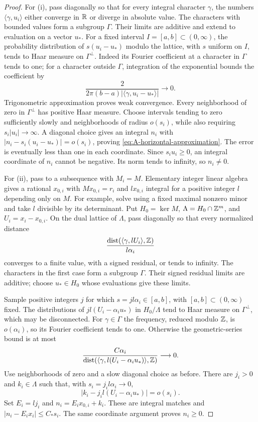 \begin{proof}
For \textup{(i)}, pass diagonally so that for every integral character
\(\gamma\), the numbers \(\langle\gamma,u_i\rangle\) either converge
in \(\mathbb R\) or diverge in absolute value.  The characters with bounded
values form a subgroup \(\Gamma\).  Their limits are additive and
extend to evaluation on a vector \(u_*\).
For a fixed interval \(I=[a,b]\subset(0,\infty)\), the probability
distribution of \(s(u_i-u_*)\) modulo the lattice, with \(s\) uniform
on \(I\), tends to Haar measure on \(\Gamma^\perp\).
Indeed its Fourier coefficient at a character in \(\Gamma\) tends to
one; for a character outside \(\Gamma\), integration of the
exponential bounds the coefficient by
\[
 \frac{2}{2\pi(b-a)
       \lvert\langle\gamma,u_i-u_*\rangle\rvert}\longrightarrow0.
\]
Trigonometric approximation proves weak convergence.
Every neighborhood of zero in \(\Gamma^\perp\) has positive Haar
measure.  Choose intervals tending to zero sufficiently slowly and
neighborhoods of radius \(o(s_i)\), while also requiring
\(s_i\lvert u_i\rvert\to\infty\).
A diagonal choice gives an integral \(n_i\) with
\(\lvert n_i-s_i(u_i-u_*)\rvert=o(s_i)\), proving
\eqref{eq:A-horizontal-approximation}.
The error is eventually less than one in each coordinate.
Since \(s_i u_i\ge0\), an integral coordinate of \(n_i\) cannot be
negative.  Its norm tends to infinity, so \(n_i\ne0\).

For \textup{(ii)}, pass to a subsequence with \(M_i=M\).
Elementary integer linear algebra gives a rational \(x_{0,i}\) with
\(Mx_{0,i}=r_i\) and \(l x_{0,i}\) integral for a positive integer
\(l\) depending only on \(M\).
For example, solve using a fixed maximal nonzero minor and take \(l\)
divisible by its determinant.
Put \(H_0=\ker M\), \(\Lambda=H_0\cap\mathbb Z^m\), and
\(U_i=x_i-x_{0,i}\).
On the dual lattice of \(\Lambda\), pass diagonally so that every
normalized distance
\[
 \frac{\operatorname{dist}
   (\langle\gamma,lU_i\rangle,\mathbb Z)}{l\alpha_i}
\]
converges to a finite value, with a signed residual, or tends to
infinity.  The characters in the first case form a subgroup
\(\Gamma\).  Their signed residual limits are additive; choose
\(u_*\in H_0\) whose evaluations give these limits.

Sample positive integers \(j\) for which
\(s=jl\alpha_i\in[a,b]\), with \([a,b]\subset(0,\infty)\) fixed.
The distributions of \(jl(U_i-\alpha_i u_*)\) in
\(H_0/\Lambda\) tend to Haar measure on \(\Gamma^\perp\), which may
be disconnected.  For \(\gamma\in\Gamma\) the frequency, reduced
modulo \(\mathbb Z\), is \(o(\alpha_i)\), so its Fourier coefficient tends
to one.  Otherwise the geometric-series bound is at most
\[
 \frac{C\alpha_i}
 {\operatorname{dist}
   (\langle\gamma,l(U_i-\alpha_i u_*)\rangle,\mathbb Z)}
 \longrightarrow0 .
\]
Use neighborhoods of zero and a slow diagonal choice as before.
There are \(j_i>0\) and \(k_i\in\Lambda\) such that, with
\(s_i=j_i l\alpha_i\to0\),
\[
 \lvert k_i-j_i l(U_i-\alpha_i u_*)\rvert=o(s_i).
\]
Set \(E_i=l j_i\) and \(n_i=E_i x_{0,i}+k_i\).
These are integral matches and
\(\lvert n_i-E_i x_i\rvert\le C_*s_i\).
The same coordinate argument proves \(n_i\ge0\).


\end{proof}
